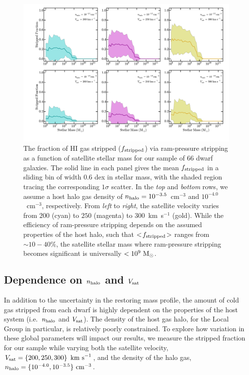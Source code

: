 \documentclass[usenatbib]{mn2e}
\newcommand{\msun}{{\rm M}_{\odot}}
\begin{document}
\begin{figure}
 \centering
 \hspace*{-0.5in}
  \includegraphics[width=7.6in]{f5.pdf}
  \caption{The fraction of H{\scriptsize I} gas stripped ($f_{\rm
      stripped}$) via ram-pressure %
    stripping as a function of satellite stellar mass for our sample
    of $66$ dwarf galaxies. The solid line in each panel gives the
    mean $f_{\rm stripped}$ in a sliding bin of width $0.6$ dex in
    stellar mass, with the shaded region tracing the corresponding
    $1\sigma$ scatter. In the \emph{top} and \emph{bottom} rows, we
    assume a host halo gas density of $n_{\rm
      halo}=10^{-3.5}$~cm$^{-3}$ and $10^{-4.0}$~cm$^{-3}$,
    respectively. From \emph{left} to \emph{right}, the satellite
    velocity varies from $200$ (cyan) to $250$ (magenta) to
    $300$~km~s$^{-1}$ (gold). While the efficiency of ram-pressure
    stripping depends on the assumed properties of the host halo, such
    that $<\!f_{\rm stripped}\!>$ ranges from $\sim10-40\%$, the
    satellite stellar mass where ram-pressure stripping becomes
    significant is universally $<10^{9}~\msun$.}
 \label{fig:MW}
\end{figure}


\subsection{Dependence on \boldmath$n_{\rm halo}$ and
  \boldmath$V_{\rm sat}$}
\label{subsec:drhoV}


In addition to the uncertainty in the restoring mass profile, the
amount of cold gas stripped from each dwarf is highly dependent on the
properties of the host system (i.e.~$n_{\rm halo}$ and $V_{\rm sat}$).
%
The density of the host gas halo, for the Local Group in particular,
is relatively poorly constrained. 
%
To explore how variation in these global parameters will impact our
results, we measure the stripped fraction for our sample while varying
both the satellite velocity, $V_{\rm sat} =\left \{200, 250, 300\right
\}~{\rm km~s}^{-1}$, and the density of the halo gas, $n_{\rm halo} =
\{10^{-4.0}, 10^{-3.5}\}~{\rm cm}^{-3}$.
\end{document}
